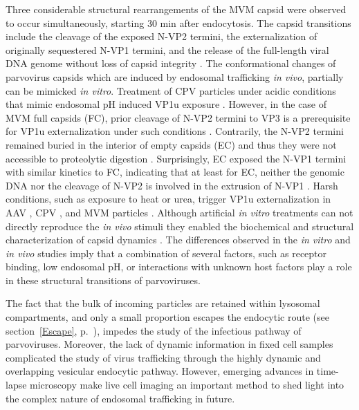 Three considerable structural rearrangements of the MVM capsid were observed to occur simultaneously, starting 30 min after endocytosis. The capsid transitions include the cleavage of the exposed N-VP2 termini, the externalization of originally sequestered N-VP1 termini, and the release of the full-length viral DNA genome without loss of capsid integrity \cite{pmid16379002}. The conformational changes of parvovirus capsids which are induced by endosomal trafficking \textit{in vivo}, partially can be mimicked \textit{in vitro}. Treatment of CPV particles under acidic conditions that mimic endosomal pH induced VP1u exposure \cite{pmid14644609}. However, in the case of MVM full capsids (FC), prior cleavage of N-VP2 termini to VP3 is a prerequisite for VP1u externalization under such conditions \cite{pmid9927584, pmid16352540}. Contrarily, the N-VP2 termini remained buried in the interior of empty capsids (EC) and thus they were not accessible to proteolytic digestion \cite{pmid16379002}. Surprisingly, EC exposed the N-VP1 termini with similar kinetics to FC, indicating that at least for EC, neither the genomic DNA nor the cleavage of N-VP2 is involved in the extrusion of N-VP1 \cite{pmid9927584, pmid16379002}. Harsh conditions, such as exposure to heat or urea, trigger VP1u externalization in AAV \cite{pmid15827144}, CPV \cite{pmid11799183, pmid9770425}, and MVM particles \cite{pmid9927584, pmid19955311}. Although artificial \textit{in vitro} treatments can not directly reproduce the \textit{in vivo} stimuli they enabled the biochemical and structural characterization of capsid dynamics \cite{pmid9927584, pmid19955311, pmid15827144, pmid11799183}. The differences observed in the \textit{in vitro} and \textit{in vivo} studies imply that a combination of several factors, such as receptor binding, low endosomal pH, or interactions with unknown host factors play a role in these structural transitions of parvoviruses.       

The fact that the bulk of incoming particles are retained within lysosomal compartments, and only a small proportion escapes the endocytic route (see section~\ref{Escape}, p.~\pageref{Escape}), impedes the study of the infectious pathway of parvoviruses. Moreover, the lack of dynamic information in fixed cell samples complicated the study of virus trafficking through the highly dynamic and overlapping vesicular endocytic pathway. However, emerging advances in time-lapse microscopy make live cell imaging an important method to shed light into the complex nature of endosomal trafficking in future.





